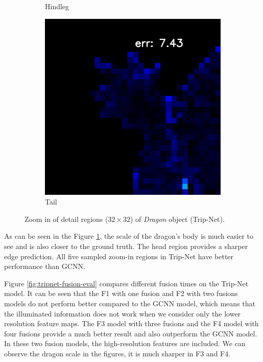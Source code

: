 \begin{figure}[H]
\begin{subfigure}[b]{0.18\linewidth}
		\caption{Hindleg}
	\end{subfigure}
	\begin{subfigure}[b]{0.18\linewidth}
		\includegraphics[width=\linewidth]{./Figures/trip_net_zoom_in/eval_7_12_-48_error.png}
		\caption{Tail}
	\end{subfigure}
	
	\decoRule
	\caption{Zoom in of detail regions ($ 32\times32 $) of \textit{Dragon} object (Trip-Net).}
	\label{fig:tripnet-eval-synthetic-zoom-in}
\end{figure}

As can be seen in the Figure \ref{fig:tripnet-eval-synthetic-zoom-in}, the scale of the dragon's body is much easier to see and is also closer to the ground truth. The head region provides a sharper edge prediction. All five sampled zoom-in regions in Trip-Net have better performance than GCNN. 


Figure \ref{fig:tripnet-fusion-eval} compares different fusion times on the Trip-Net model. It can be seen that the F1 with one fusion and F2 with two fusions models do not perform better compared to the GCNN model, which means that the illuminated information does not work when we consider only the lower resolution feature maps. The F3 model with three fusions and the F4 model with four fusions provide a much better result and also outperform the GCNN model. In these two fusion models, the high-resolution features are included. We can observe the dragon scale in the figures, it is much sharper in F3 and F4.

